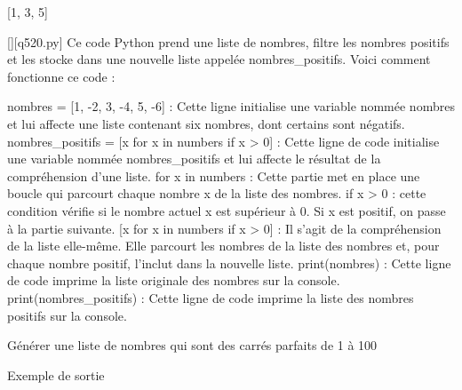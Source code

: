 [1, 3, 5]
        \par
        \begin{solution}
            \renewcommand{\nomfichier}{q520.py}
            \pythonfile{\chemincode \nomfichier}[][\nomfichier]
            Ce code Python prend une liste de nombres, filtre les nombres positifs et les stocke dans une nouvelle liste appelée nombres_positifs. Voici comment fonctionne ce code :

    nombres = [1, -2, 3, -4, 5, -6] : Cette ligne initialise une variable nommée nombres et lui affecte une liste contenant six nombres, dont certains sont négatifs.
    nombres_positifs = [x for x in numbers if x > 0] : Cette ligne de code initialise une variable nommée nombres_positifs et lui affecte le résultat de la compréhension d'une liste.
        for x in numbers : Cette partie met en place une boucle qui parcourt chaque nombre x de la liste des nombres.
        if x > 0 : cette condition vérifie si le nombre actuel x est supérieur à 0. Si x est positif, on passe à la partie suivante.
        [x for x in numbers if x > 0] : Il s'agit de la compréhension de la liste elle-même. Elle parcourt les nombres de la liste des nombres et, pour chaque nombre positif, l'inclut dans la nouvelle liste.
    print(nombres) : Cette ligne de code imprime la liste originale des nombres sur la console.
    print(nombres_positifs) : Cette ligne de code imprime la liste des nombres positifs sur la console.
        \end{solution}
        

        \question
        Générer une liste de nombres qui sont des carrés parfaits de 1 à 100

Exemple de sortie

